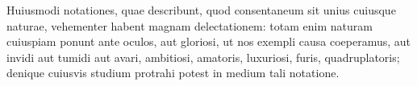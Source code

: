 Huiusmodi notationes, quae describunt, quod consentaneum sit unius cuiusque naturae, vehementer habent magnam delectationem: totam enim naturam cuiuspiam ponunt ante oculos, aut gloriosi, ut nos exempli causa coeperamus, aut invidi aut tumidi aut avari, ambitiosi, amatoris, luxuriosi, furis, quadruplatoris; denique cuiusvis studium protrahi potest in medium tali notatione.
